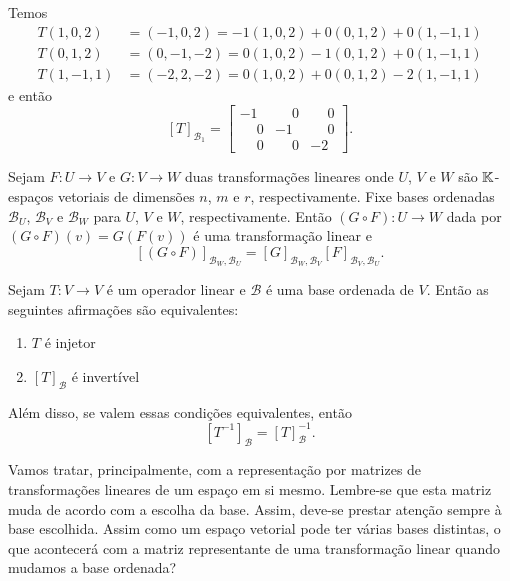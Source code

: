 \begin{exemplos}
\begin{enumerate}[label={\arabic*})]
\begin{solucao}
            Temos
            \begin{align*}
                T(1, 0, 2) &= (-1, 0, 2) = -1(1, 0, 2) + 0(0, 1, 2) + 0(1, -1, 1)\\
                T(0, 1, 2) &= (0, -1, -2) = 0(1, 0, 2) - 1(0, 1, 2) + 0(1, -1, 1)\\
                T(1, -1, 1) &= (-2, 2, -2) = 0(1, 0, 2) + 0(0, 1, 2) - 2(1, -1, 1)
            \end{align*}
            e então
            \[
                [T]_{\mathcal{B}_1} = \begin{bmatrix}-1 & \phantom{-}0 & \phantom{-}0\\\phantom{-}0 & -1 & \phantom{-}0\\\phantom{-}0 & \phantom{-}0 & -2\end{bmatrix}.
            \]
        \end{solucao}
    \end{enumerate}
\end{exemplos}

\begin{teorema}\label{matriz_da_composicao_de_transformacoes}
    Sejam $F \colon U \to V$ e $G \colon V \to W$ duas transformações lineares onde $U$, $V$ e $W$ são $\mathbb{K}$-espaços vetoriais de dimensões $n$, $m$ e $r$, respectivamente. Fixe bases ordenadas $\mathcal{B}_U$, $\mathcal{B}_V$ e $\mathcal{B}_W$ para $U$, $V$ e $W$, respectivamente. Então $(G \circ F) \colon U \to W$ dada por $(G\circ F)(v) = G(F(v))$ é uma transformação linear e
    \[
        [(G \circ F)]_{{\mathcal{B}_W},{\mathcal{B}_U}} = [G]_{{\mathcal{B}_W},{\mathcal{B}_V}}[F]_{{\mathcal{B}_V},{\mathcal{B}_U}}.
    \]
\end{teorema}

\begin{teorema}
    Sejam $T \colon V \to V$ é um operador linear e $\mathcal{B}$ é uma base ordenada de $V$. Então as seguintes afirmações são equivalentes:
    \begin{enumerate}[label={\roman*})]
        \item $T$ é injetor
        \item $[T]_\mathcal{B}$ é invertível
    \end{enumerate}
    Além disso, se valem essas condições equivalentes, então
    \[
        [T^{-1}]_\mathcal{B} = [T]_\mathcal{B}^{-1}.
    \]
\end{teorema}

Vamos tratar, principalmente, com a representação por matrizes de transformações lineares de um espaço em si mesmo. Lembre-se que esta matriz muda de acordo com a escolha da base. Assim, deve-se prestar atenção sempre à base escolhida. Assim como um espaço vetorial pode ter várias bases distintas, o que acontecerá com a matriz representante de uma transformação linear quando mudamos a base ordenada?

